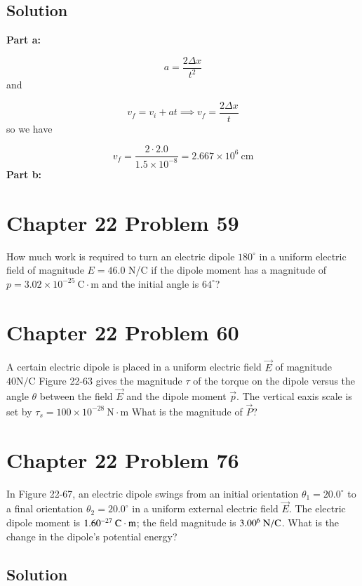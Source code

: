 \documentclass{article}
\newcommand{\m}{\text{m}}
\newcommand{\centi}{\text{c}}
\newcommand{\N}{\text{N}}
\newcommand{\C}{\text{C}}
\begin{document}
\subsection*{Solution}
\textbf{Part a:}

\[
	a = \frac{2\Delta x}{t^2}
\]
and

\[
	v_f = v_i + at \implies v_f = \frac{2\Delta x}{t} 
\]
so we have

\[
	v_f = \frac{2\cdot 2.0}{1.5 \times 10^{-8}} = \boxed{2.667 \times 10^6\ \centi\m}
\]
\textbf{Part b:}



\section*{Chapter 22 Problem 59}
How much work is required to turn an electric dipole $180^\circ$ in a uniform electric field of magnitude $E = 46.0$ N/C if the dipole moment has a magnitude of $p=3.02 \times 10^{-25}\ \C \cdot \m$ and the initial angle is $64^\circ$?

\section*{Chapter 22 Problem 60}
A certain electric dipole is placed in a uniform electric field $\vec E$ of magnitude $40 \N/\C$ Figure 22-63 gives the magnitude $\tau$ of the torque on the dipole versus the angle $\theta$ between the field $\vec E$ and the dipole moment $\vec p$. The vertical eaxis scale is set by $\tau_s = 100 \times 10^{-28}\ \N \cdot \m $ What is the magnitude of $\vec P$?

\section*{Chapter 22 Problem 76}
In Figure 22-67, an electric dipole swings from an initial orientation $\theta_1 = 20.0^\circ$ to a final orientation $\theta_2 = 20.0^\circ$ in a uniform external electric field $\vec E$. The electric dipole moment is $1.60 \time 10^{-27}\ \C \cdot \m$; the field magnitude is $3.00 \time 10^6\ \N/\C$. What is the change in the dipole's potential energy?




\subsection*{Solution}
\end{document}
